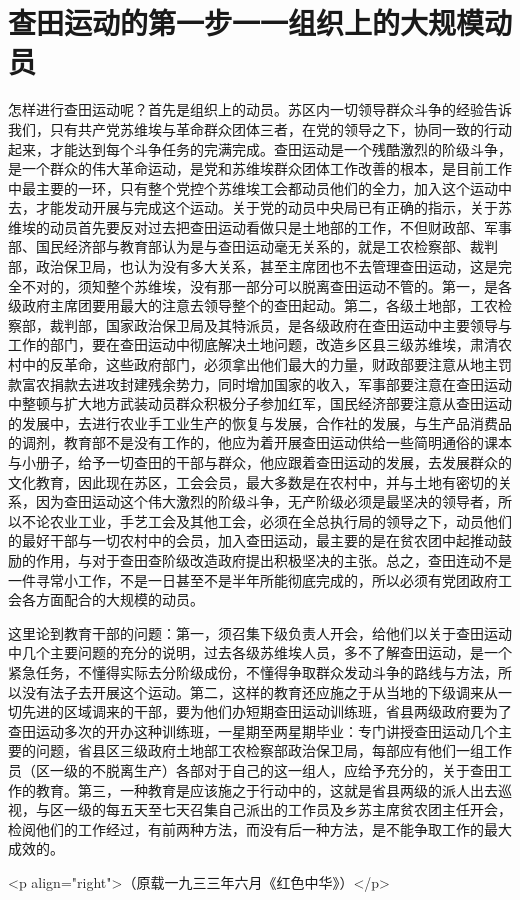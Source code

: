 \section[查田运动的第一步一一组织上的大规模动员（一九三三年六月）]{查田运动的第一步一一组织上的大规模动员}


怎样进行查田运动呢？首先是组织上的动员。苏区内一切领导群众斗争的经验告诉我们，只有共产党苏维埃与革命群众团体三者，在党的领导之下，协同一致的行动起来，才能达到每个斗争任务的完满完成。查田运动是一个残酷激烈的阶级斗争，是一个群众的伟大革命运动，是党和苏维埃群众团体工作改善的根本，是目前工作中最主要的一环，只有整个党控个苏维埃工会都动员他们的全力，加入这个运动中去，才能发动开展与完成这个运动。关于党的动员中央局已有正确的指示，关于苏维埃的动员首先要反对过去把查田运动看做只是土地部的工作，不但财政部、军事部、国民经济部与教育部认为是与查田运动毫无关系的，就是工农检察部、裁判部，政治保卫局，也认为没有多大关系，甚至主席团也不去管理查田运动，这是完全不对的，须知整个苏维埃，没有那一部分可以脱离查田运动不管的。第一，是各级政府主席团要用最大的注意去领导整个的查田起动。第二，各级土地部，工农检察部，裁判部，国家政治保卫局及其特派员，是各级政府在查田运动中主要领导与工作的部门，要在查田运动中彻底解决土地问题，改造乡区县三级苏维埃，肃清农村中的反革命，这些政府部门，必须拿出他们最大的力量，财政部要注意从地主罚款富农捐款去进攻封建残余势力，同时增加国家的收入，军事部要注意在查田运动中整顿与扩大地方武装动员群众积极分子参加红军，国民经济部要注意从查田运动的发展中，去进行农业手工业生产的恢复与发展，合作社的发展，与生产品消费品的调剂，教育部不是没有工作的，他应为着开展查田运动供给一些简明通俗的课本与小册子，给予一切查田的干部与群众，他应跟着查田运动的发展，去发展群众的文化教育，因此现在苏区，工会会员，最大多数是在农村中，并与土地有密切的关系，因为查田运动这个伟大激烈的阶级斗争，无产阶级必须是最坚决的领导者，所以不论农业工业，手艺工会及其他工会，必须在全总执行局的领导之下，动员他们的最好干部与一切农村中的会员，加入查田运动，最主要的是在贫农团中起推动鼓励的作用，与对于查田查阶级改造政府提出积极坚决的主张。总之，查田连动不是一件寻常小工作，不是一日甚至不是半年所能彻底完成的，所以必须有党团政府工会各方面配合的大规模的动员。

这里论到教育干部的问题：第一，须召集下级负责人开会，给他们以关于查田运动中几个主要问题的充分的说明，过去各级苏维埃人员，多不了解查田运动，是一个紧急任务，不懂得实际去分阶级成份，不懂得争取群众发动斗争的路线与方法，所以没有法子去开展这个运动。第二，这样的教育还应施之于从当地的下级调来从一切先进的区域调来的干部，要为他们办短期查田运动训练班，省县两级政府要为了查田运动多次的开办这种训练班，一星期至两星期毕业：专门讲授查田运动几个主要的问题，省县区三级政府土地部工农检察部政治保卫局，每部应有他们一组工作员（区一级的不脱离生产）各部对于自己的这一组人，应给予充分的，关于查田工作的教育。第三，一种教育是应该施之于行动中的，这就是省县两级的派人出去巡视，与区一级的每五天至七天召集自己派出的工作员及乡苏主席贫农团主任开会，检阅他们的工作经过，有前两种方法，而没有后一种方法，是不能争取工作的最大成效的。

<p align="right">（原载一九三三年六月《红色中华》）</p>
